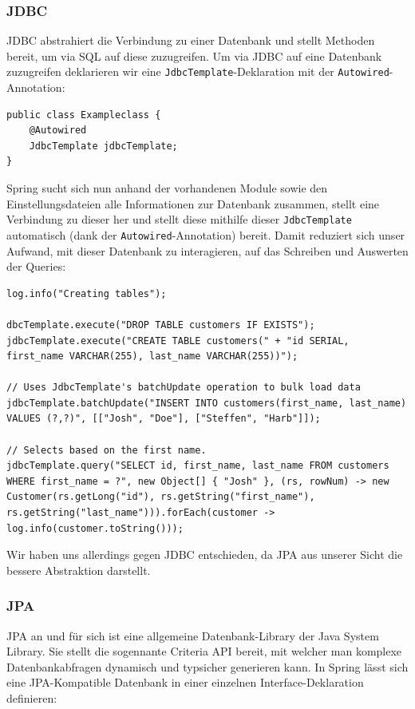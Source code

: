 \documentclass{article}
\begin{document}
\subsubsection{JDBC}

JDBC abstrahiert die Verbindung zu einer Datenbank und stellt Methoden bereit, um via SQL auf diese zuzugreifen.
Um via JDBC auf eine Datenbank zuzugreifen deklarieren wir eine \texttt{JdbcTemplate}-Deklaration mit der \texttt{Autowired}-Annotation:

\begin{lstlisting}
public class Exampleclass {
    @Autowired
    JdbcTemplate jdbcTemplate;
}
\end{lstlisting}

Spring sucht sich nun anhand der vorhandenen Module sowie den Einstellungsdateien alle Informationen zur Datenbank zusammen, stellt eine Verbindung zu dieser her und stellt diese mithilfe dieser \texttt{JdbcTemplate} automatisch (dank der \texttt{Autowired}-Annotation) bereit.
Damit reduziert sich unser Aufwand, mit dieser Datenbank zu interagieren, auf das Schreiben und Auswerten der Queries:

\begin{lstlisting}
log.info("Creating tables");

dbcTemplate.execute("DROP TABLE customers IF EXISTS");
jdbcTemplate.execute("CREATE TABLE customers(" + "id SERIAL, first_name VARCHAR(255), last_name VARCHAR(255))");

// Uses JdbcTemplate's batchUpdate operation to bulk load data
jdbcTemplate.batchUpdate("INSERT INTO customers(first_name, last_name) VALUES (?,?)", [["Josh", "Doe"], ["Steffen", "Harb"]]);

// Selects based on the first name.
jdbcTemplate.query("SELECT id, first_name, last_name FROM customers WHERE first_name = ?", new Object[] { "Josh" }, (rs, rowNum) -> new Customer(rs.getLong("id"), rs.getString("first_name"), rs.getString("last_name"))).forEach(customer -> log.info(customer.toString()));
\end{lstlisting}

Wir haben uns allerdings gegen JDBC entschieden, da JPA aus unserer Sicht die bessere Abstraktion darstellt.

\subsubsection{JPA}

JPA an und für sich ist eine allgemeine Datenbank-Library der Java System Library.
Sie stellt die sogennante Criteria API bereit, mit welcher man komplexe Datenbankabfragen dynamisch und typsicher generieren kann.
In Spring lässt sich eine JPA-Kompatible Datenbank in einer einzelnen Interface-Deklaration definieren:
\end{document}
